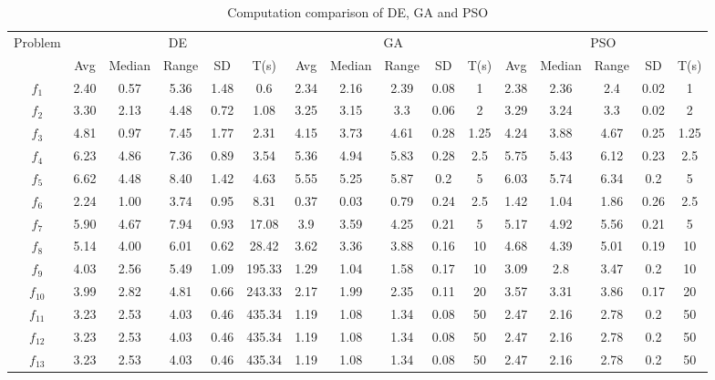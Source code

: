 \documentclass[paper=a4, fontsize=11pt]{scrartcl} %
\numberwithin{equation}{section} %
\numberwithin{figure}{section} %
\numberwithin{table}{section} %
\begin{document}
\begin{sidewaystable}
	\small
	\centering
	\caption{Computation comparison of DE, GA and PSO}
	\label{Tab1d}
	\begin{tabular}{c|ccccc|ccccc|ccccc}
	\noalign{\smallskip}\hline\noalign{\smallskip}
	Problem & \multicolumn{5}{c}{DE}& \multicolumn{5}{|c|}{GA}
        &  \multicolumn{5}{c}{PSO} \\ 
	\noalign{\smallskip}\hline\noalign{\smallskip}
		 & Avg & Median & Range & SD & T(s) & Avg & Median
                 & Range & SD & T(s) & Avg & Median & Range & SD &
                 T(s) \\ 
\noalign{\smallskip}\hline\noalign{\smallskip}
			$f_1$ & 2.40 & 0.57 & 5.36 & 1.48 & 0.6 & 2.34 & 2.16 & 2.39 & 0.08 & 1 & 2.38 & 2.36 & 2.4 & 0.02 & 1 \\ 
			$f_2$ & 3.30 & 2.13 & 4.48 & 0.72 & 1.08 & 3.25 & 3.15 & 3.3 & 0.06 & 2 & 3.29 & 3.24 & 3.3 & 0.02 & 2 \\ 
			$f_3$ & 4.81 & 0.97 & 7.45 & 1.77 & 2.31 & 4.15 & 3.73 & 4.61 & 0.28 & 1.25 & 4.24 & 3.88 & 4.67 & 0.25 & 1.25 \\ 
			$f_4$ & 6.23 & 4.86 & 7.36 & 0.89 & 3.54 & 5.36 & 4.94 & 5.83 & 0.28 & 2.5 & 5.75 & 5.43 & 6.12 & 0.23 & 2.5 \\ 
			$f_5$ & 6.62 & 4.48 & 8.40 & 1.42 & 4.63 & 5.55 & 5.25 & 5.87 & 0.2 & 5 & 6.03 & 5.74 & 6.34 & 0.2 & 5 \\ 
			$f_6$ & 2.24 & 1.00 & 3.74 & 0.95 & 8.31 & 0.37 & 0.03 & 0.79 & 0.24 & 2.5 & 1.42 & 1.04 & 1.86 & 0.26 & 2.5 \\ 
			$f_7$ & 5.90 & 4.67 & 7.94 & 0.93 & 17.08 & 3.9 & 3.59 & 4.25 & 0.21 & 5 & 5.17 & 4.92 & 5.56 & 0.21 & 5 \\ 
			$f_8$ & 5.14 & 4.00 & 6.01 & 0.62 & 28.42 & 3.62 & 3.36 & 3.88 & 0.16 & 10 & 4.68 & 4.39 & 5.01 & 0.19 & 10 \\ 
			$f_9$ & 4.03 & 2.56 & 5.49 & 1.09 & 195.33 & 1.29 & 1.04 & 1.58 & 0.17 & 10 & 3.09 & 2.8 & 3.47 & 0.2 & 10 \\ 
			$f_{10}$ & 3.99 & 2.82 & 4.81 & 0.66 & 243.33 & 2.17 & 1.99 & 2.35 & 0.11 & 20 & 3.57 & 3.31 & 3.86 & 0.17 & 20 \\ 
			$f_{11}$ & 3.23 & 2.53 & 4.03 & 0.46 & 435.34 & 1.19 & 1.08 & 1.34 & 0.08 & 50 & 2.47 & 2.16 & 2.78 & 0.2 & 50 \\ 
			$f_{12}$ & 3.23 & 2.53 & 4.03 & 0.46 & 435.34 & 1.19 & 1.08 & 1.34 & 0.08 & 50 & 2.47 & 2.16 & 2.78 & 0.2 & 50 \\ 
			$f_{13}$ & 3.23 & 2.53 & 4.03 & 0.46 & 435.34 & 1.19 & 1.08 & 1.34 & 0.08 & 50 & 2.47 & 2.16 & 2.78 & 0.2 & 50 \\ 

\end{tabular}
\end{sidewaystable}
\end{document}

